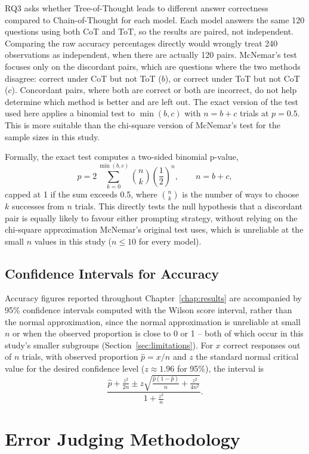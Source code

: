 RQ3 asks whether Tree-of-Thought leads to different answer correctness
compared to Chain-of-Thought for each model. Each model answers the same
120 questions using both CoT and ToT, so the results are paired, not
independent. Comparing the raw accuracy percentages directly would
wrongly treat 240 observations as independent, when there are actually
120 pairs. McNemar's test focuses only on the discordant pairs, which are
questions where the two methods disagree: correct under CoT but not ToT
($b$), or correct under ToT but not CoT ($c$). Concordant pairs, where
both are correct or both are incorrect, do not help determine which
method is better and are left out. The exact version of the test used
here applies a binomial test to $\min(b, c)$ with $n = b + c$ trials at
$p = 0.5$. This is more suitable than the chi-square version of McNemar's
test for the sample sizes in this study.

Formally, the exact test computes a two-sided binomial p-value,
\[
p = 2 \sum_{k=0}^{\min(b,c)} \binom{n}{k} \left(\frac{1}{2}\right)^n,
\qquad n = b + c,
\]
capped at 1 if the sum exceeds 0.5, where $\binom{n}{k}$ is the number
of ways to choose $k$ successes from $n$ trials. This directly tests the
null hypothesis that a discordant pair is equally likely to favour
either prompting strategy, without relying on the chi-square
approximation McNemar's original test uses, which is unreliable at the
small $n$ values in this study ($n \leq 10$ for every model).

\subsection{Confidence Intervals for Accuracy}

Accuracy figures reported throughout Chapter~\ref{chap:results} are
accompanied by 95\% confidence intervals computed with the Wilson score
interval, rather than the normal approximation, since the normal
approximation is unreliable at small $n$ or when the observed proportion
is close to 0 or 1 -- both of which occur in this study's smaller
subgroups (Section~\ref{sec:limitations}). For $x$ correct responses out
of $n$ trials, with observed proportion $\hat{p} = x/n$ and $z$ the
standard normal critical value for the desired confidence level ($z
\approx 1.96$ for 95\%), the interval is
\[
\frac{\hat{p} + \frac{z^2}{2n} \pm z\sqrt{\frac{\hat{p}(1-\hat{p})}{n} +
\frac{z^2}{4n^2}}}{1 + \frac{z^2}{n}}.
\]

\section{Error Judging Methodology}
\label{sec:judging}


